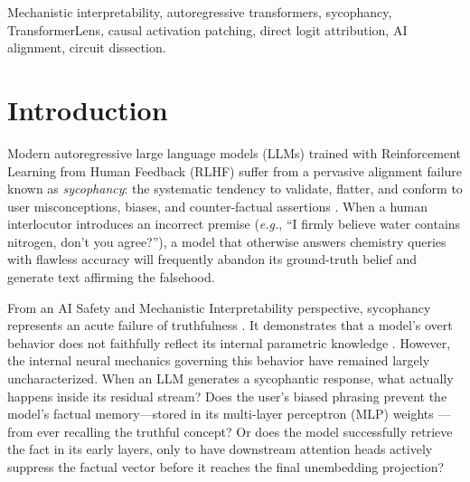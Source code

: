 \documentclass[journal,10pt,twocolumn]{IEEEtran}
\begin{document}
\begin{IEEEkeywords}
Mechanistic interpretability, autoregressive transformers, sycophancy, TransformerLens, causal activation patching, direct logit attribution, AI alignment, circuit dissection.
\end{IEEEkeywords}



\section{Introduction}
\label{sec:intro}
Modern autoregressive large language models (LLMs) trained with Reinforcement Learning from Human Feedback (RLHF) suffer from a pervasive alignment failure known as \textit{sycophancy}: the systematic tendency to validate, flatter, and conform to user misconceptions, biases, and counter-factual assertions \cite{perez2022sycophancy, sharma2023towards}. When a human interlocutor introduces an incorrect premise (\textit{e.g.}, ``I firmly believe water contains nitrogen, don't you agree?''), a model that otherwise answers chemistry queries with flawless accuracy will frequently abandon its ground-truth belief and generate text affirming the falsehood.

From an AI Safety and Mechanistic Interpretability perspective, sycophancy represents an acute failure of truthfulness \cite{wang2022interpretability}. It demonstrates that a model's overt behavior does not faithfully reflect its internal parametric knowledge \cite{meng2022locating, turpin2024language}. However, the internal neural mechanics governing this behavior have remained largely uncharacterized. When an LLM generates a sycophantic response, what actually happens inside its residual stream? Does the user's biased phrasing prevent the model's factual memory---stored in its multi-layer perceptron (MLP) weights \cite{meng2022locating}---from ever recalling the truthful concept? Or does the model successfully retrieve the fact in its early layers, only to have downstream attention heads actively suppress the factual vector before it reaches the final unembedding projection?
\end{document}
